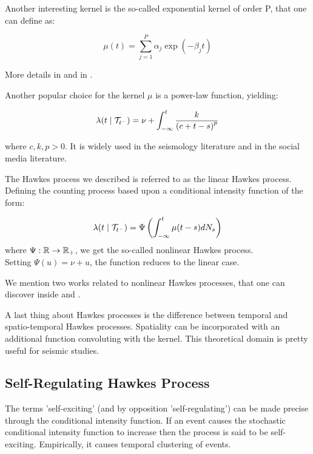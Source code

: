\begin{remarque}
Another interesting kernel is the so-called exponential kernel of order P, that one can define as:

$$ \mu (t) = \sum_{j=1}^P \alpha_j \exp( - \beta_j t ) $$

More details in \cite{exphawkes} and in \cite{exphawkes2}.
\end{remarque}

\begin{remarque}
Another popular choice for the kernel $\mu$ is a power-law function, yielding:

$$ \lambda (t \mid \mathcal{T}_{t^-} ) = \nu + \int_{- \infty }^t \frac{ k }{ \left ( c + t - s \right ) ^p } $$

where $c,k,p > 0$. It is widely used in the seismology literature and in the social media literature.
\end{remarque}




\begin{remarque}
The Hawkes process we described is referred to as the linear Hawkes process. Defining the counting process based upon a conditional intensity function of the form:

$$ \lambda (t \mid \mathcal{T}_{t^-}) = \Psi \left ( \int_{-\infty}^t \mu(t-s) dN_s \right ) $$ where $\Psi : \mathbb{R} \to \mathbb{R}_+$, we get the so-called nonlinear Hawkes process. \\Setting $\Psi(u) = \nu + u$, the function reduces to the linear case. 

We mention two works related to nonlinear Hawkes processes, that one can discover inside \cite{nonlinearHP1} and \cite{nonlinearHP2}.
\end{remarque}

\begin{remarque}
A last thing about Hawkes processes is the difference between temporal and spatio-temporal Hawkes processes. Spatiality can be incorporated with an additional function convoluting with the kernel. This theoretical domain is pretty useful for seismic studies.
\end{remarque}



\subsection{Self-Regulating Hawkes Process}
\label{section:obral}

The terms 'self-exciting'  (and by opposition 'self-regulating') can be made precise through the conditional intensity function. If an event causes the stochastic conditional intensity function to increase then the process is said to be self-exciting. Empirically, it causes temporal clustering of events. 

